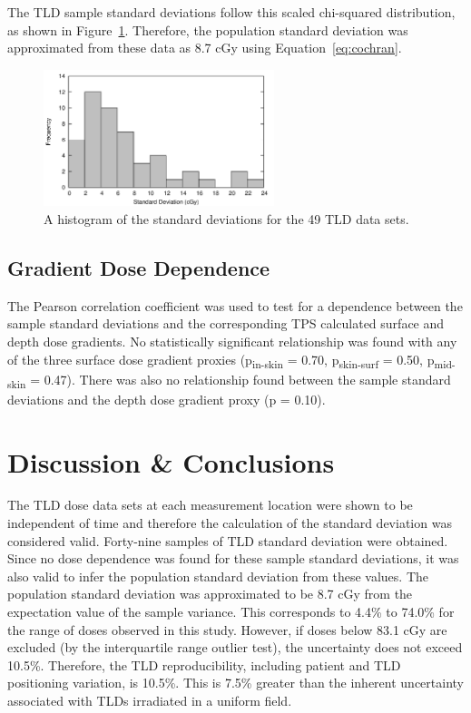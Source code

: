 The TLD sample standard deviations follow this scaled chi-squared distribution, as shown in Figure~\ref{fig:p5-stdev_histogram}. Therefore, the population standard deviation was approximated from these data as 8.7 cGy using Equation~\ref{eq:cochran}.

\begin{figure}
	\centering \includegraphics[width=0.6\textwidth]{figures/p5-stdev_histogram.png}
	\caption[A histogram of the standard deviations for the 49 TLD data sets]{\label{fig:p5-stdev_histogram}A histogram of the standard deviations for the 49 TLD data sets.}
\end{figure}

\subsection{Gradient Dose Dependence}
The Pearson correlation coefficient was used to test for a dependence between the sample standard deviations and the corresponding TPS calculated surface and depth dose gradients. No statistically significant relationship was found with any of the three surface dose gradient proxies (p\textsubscript{in-skin} = 0.70, p\textsubscript{skin-surf} = 0.50, p\textsubscript{mid-skin} = 0.47). There was also no relationship found between the sample standard deviations and the depth dose gradient proxy (p = 0.10).

\section{Discussion \& Conclusions}
The TLD dose data sets at each measurement location were shown to be independent of time and therefore the calculation of the standard deviation was considered valid. Forty-nine samples of TLD standard deviation were obtained. Since no dose dependence was found for these sample standard deviations, it was also valid to infer the population standard deviation from these values. The population standard deviation was approximated to be 8.7 cGy from the expectation value of the sample variance. This corresponds to 4.4\% to 74.0\% for the range of doses observed in this study. However, if doses below 83.1 cGy are excluded (by the interquartile range outlier test), the uncertainty does not exceed 10.5\%. Therefore, the TLD reproducibility, including patient and TLD positioning variation, is 10.5\%. This is 7.5\% greater than the inherent uncertainty associated with TLDs irradiated in a uniform field.

